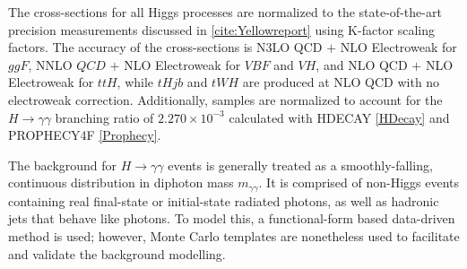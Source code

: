 The cross-sections for all Higgs processes are normalized to the state-of-the-art precision measurements discussed in \ref{cite:Yellowreport} using K-factor scaling factors. The accuracy of the cross-sections is N3LO QCD $+$ NLO Electroweak for $ggF$, NNLO $QCD$ $+$ NLO Electroweak for $VBF$ and $VH$, and NLO QCD $+$ NLO Electroweak for $ttH$, while $tHjb$ and $tWH$ are produced at NLO QCD with no electroweak correction. Additionally, samples are normalized to account for the $H \rightarrow \gamma \gamma$ branching ratio of $2.270 \times 10^{-3}$ calculated with HDECAY \ref{HDecay} and PROPHECY4F \ref{Prophecy}.

\begin{table}[h!]
  \centering
  \caption{Cross sections times branching ratio values used to normalize each production mode. The values correspond to the state-of-the-art predictions and are taken from the CERN Yellow Report \ref{cite:yellowreport}.}
  \label{tab:signal_samples_norm}
\end{table}  

The background for $H \rightarrow \gamma \gamma$ events is generally treated as a smoothly-falling, continuous distribution in diphoton mass $m_{\gamma \gamma}$. It is comprised of non-Higgs events containing real final-state or initial-state radiated photons, as well as hadronic jets that behave like photons. To model this, a functional-form based data-driven method is used; however, Monte Carlo templates are nonetheless used to facilitate and validate the background modelling.

